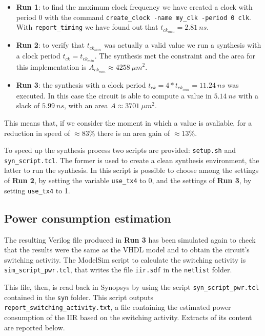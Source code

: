 \begin{itemize}
    \item \textbf{Run 1}: to find the maximum clock frequency we have created a clock with period 0 with the command
        \verb|create_clock -name my_clk -period 0 clk|. With \verb|report_timing| we have found out that $t_{ck_{min}} = 2.81\ ns$.
    \item \textbf{Run 2}: to verify that $t_{ck_{min}}$ was actually a valid value we run a synthesis with a clock period
        $t_{ck} = t_{ck_{min}}$. The synthesis met the constraint and the area for this implementation is $A_{ck_{min}} \approx 4258\ \mu m^2$.
    \item \textbf{Run 3}: the synthesis with a clock period $t_{ck} = 4*t_{ck_{min}} = 11.24\ ns$ was executed. In this case the circuit is
        able to compute a value in $5.14\ ns$ with a slack of $5.99\ ns$, with an area $A \approx 3701\ \mu m^2$. 
\end{itemize}

This means that, if we consider the moment in which a value is avaliable, for a reduction in speed of $\approx 83\%$ there is an area gain of $\approx 13\%$.

To speed up the synthesis process two scripts are provided: \verb|setup.sh| and \verb|syn_script.tcl|. The former is used to create a
clean synthesis environment, the latter to run the synthesis. In this script is possible to choose among the settings of \textbf{Run 2},
by setting the variable \verb|use_tx4| to 0, and the settings of \textbf{Run 3}, by setting \verb|use_tx4| to 1. 

\subsection{Power consumption estimation}

The resulting Verilog file produced in \textbf{Run 3} has been simulated again to check that the results were the same as the VHDL model
and to obtain the circuit's switching activity. The ModelSim script to calculate the switching activity is \verb|sim_script_pwr.tcl|, that writes the file
\verb|iir.sdf| in the \verb|netlist| folder.

This file, then, is read back in Synopsys by using the script \verb|syn_script_pwr.tcl| contained in the \verb|syn| folder. This script outputs
\verb|report_switching_activity.txt|, a file containing the estimated power consumption of the IIR based on the switching activity.
Extracts of its content are reported below.

